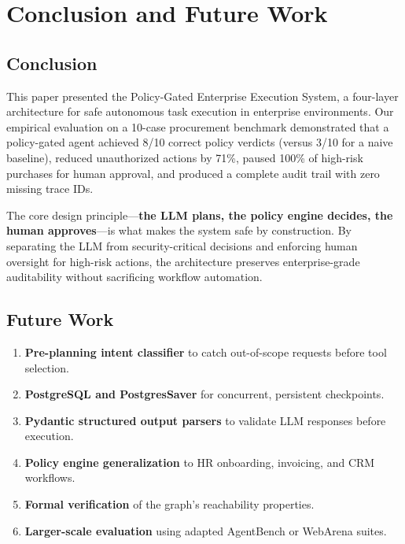\documentclass[11pt,a4paper]{article}
\begin{document}
\section{Conclusion and Future Work}
\label{sec:conclusion}

\subsection{Conclusion}

This paper presented the Policy-Gated Enterprise Execution System, a four-layer architecture for safe autonomous task execution in enterprise environments. Our empirical evaluation on a 10-case procurement benchmark demonstrated that a policy-gated agent achieved 8/10 correct policy verdicts (versus 3/10 for a naive baseline), reduced unauthorized actions by 71\%, paused 100\% of high-risk purchases for human approval, and produced a complete audit trail with zero missing trace IDs.

The core design principle---\textbf{the LLM plans, the policy engine decides, the human approves}---is what makes the system safe by construction. By separating the LLM from security-critical decisions and enforcing human oversight for high-risk actions, the architecture preserves enterprise-grade auditability without sacrificing workflow automation.

\subsection{Future Work}

\begin{enumerate}[leftmargin=*, itemsep=2pt]
    \item \textbf{Pre-planning intent classifier} to catch out-of-scope requests before tool selection.
    \item \textbf{PostgreSQL and PostgresSaver} for concurrent, persistent checkpoints.
    \item \textbf{Pydantic structured output parsers} to validate LLM responses before execution.
    \item \textbf{Policy engine generalization} to HR onboarding, invoicing, and CRM workflows.
    \item \textbf{Formal verification} of the graph's reachability properties.
    \item \textbf{Larger-scale evaluation} using adapted AgentBench or WebArena suites.
\end{enumerate}
\end{document}
